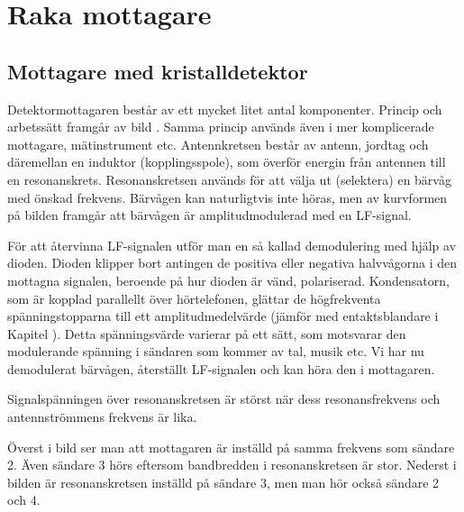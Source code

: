 \section{Raka mottagare}

\subsection{Mottagare med kristalldetektor}


Detektormottagaren består av ett mycket litet antal komponenter.
Princip och arbetssätt framgår av bild .
Samma princip används även i mer komplicerade mottagare, mätinstrument etc.
Antennkretsen består av antenn, jordtag och däremellan en induktor
(kopplingsspole), som överför energin från antennen till en resonanskrets.
Resonanskretsen används för att välja ut (selektera) en bärvåg med önskad
frekvens.
Bärvågen kan naturligtvis inte höras, men av kurvformen på bilden framgår
att bärvågen är amplitudmodulerad med en LF-signal.

För att återvinna LF-signalen utför man en så kallad demodulering med hjälp
av dioden.
Dioden klipper bort antingen de positiva eller negativa halvvågorna i den
mottagna signalen, beroende på hur dioden är vänd, polariserad.
Kondensatorn, som är kopplad parallellt över hörtelefonen, glättar de
högfrekventa spänningstopparna till ett amplitudmedelvärde (jämför med
entaktsblandare i Kapitel ).
Detta spänningsvärde varierar på ett sätt, som motsvarar den modulerande
spänning i sändaren som kommer av tal, musik etc.
Vi har nu demodulerat bärvågen, återställt LF-signalen och kan höra den i
mottagaren.

Signalspänningen över resonanskretsen är störst när dess
resonansfrekvens och antennströmmens frekvens är lika.

{}

Överst i bild  ser man att mottagaren är inställd på
samma frekvens som sändare 2.
Även sändare 3 hörs eftersom bandbredden i resonanskretsen är stor.
Nederst i bilden är resonanskretsen inställd på sändare 3, men man hör
också sändare 2 och 4.

